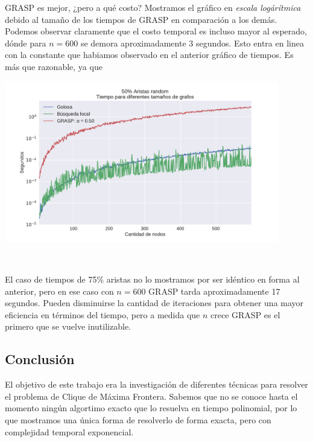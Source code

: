 GRASP es mejor, ¿pero a qué costo? Mostramos el gráfico en \textit{escala logárítmica} debido al tamaño de los tiempos de GRASP en comparación a los demás. Podemos observar claramente que el costo temporal es incluso mayor al esperado, dónde para $n = 600$ se demora aproximadamente 3 segundos. Esto entra en linea con la constante que habiamos observado en el anterior gráfico de tiempos. Es más que razonable, ya que  \\

{\centering
    \includegraphics[width=0.9\textwidth]{informe/imgs/exp_random50_tiempo_todos_ngrande_logy.pdf}
    
}
$ $ \newline

El caso de tiempos de 75\% aristas no lo mostramos por ser idéntico en forma al anterior, pero en ese caso con $n = 600$ GRASP tarda aproximadamente 17 segundos. Pueden disminuirse la cantidad de iteraciones para obtener una mayor eficiencia en términos del tiempo, pero a medida que $n$ crece GRASP es el primero que se vuelve inutilizable.



\subsection{Conclusión}

El objetivo de este trabajo era la investigación de diferentes técnicas para resolver el problema de Clique de Máxima Frontera. Sabemos que no se conoce hasta el momento ningún algortimo exacto que lo resuelva en tiempo polinomial, por lo que mostramos una única forma de resolverlo de forma exacta, pero con complejidad temporal exponencial. \\

